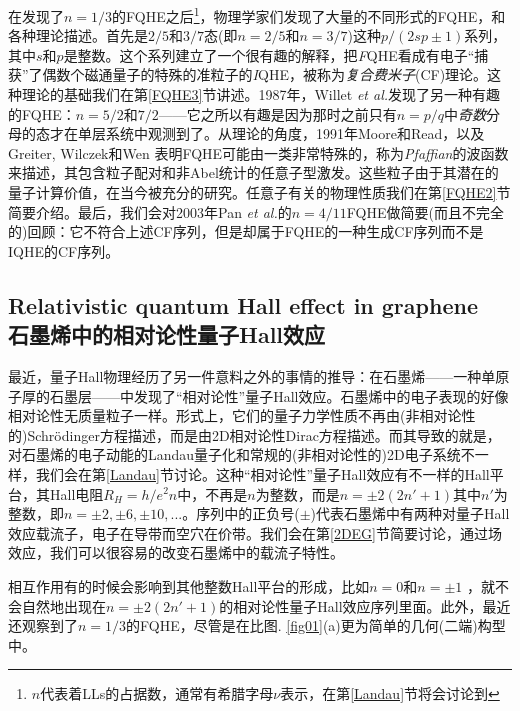 \documentclass[10pt]{book}
\newcommand\itt{\it\color{blue}}
\begin{document}
在发现了$n=1/3$的FQHE之后\footnote{$n$代表着LLs的占据数，通常有希腊字母$\nu$表示，在第\ref{Landau}节将会讨论到}，物理学家们发现了大量的不同形式的FQHE，和各种理论描述。首先是$2/5$和$3/7$态(即$n=2/5$和$n=3/7$)这种$p/(2sp\pm 1)$系列，其中$s$和$p$是整数。这个系列建立了一个很有趣的解释，把{\sl F}QHE看成有电子``捕获''了偶数个磁通量子的特殊的准粒子的{\sl I}QHE，被称为{\itt 复合费米子}(CF)理论\cite{Jain1,Jain2}。这种理论的基础我们在第\ref{FQHE3}节讲述。1987年，Willet {\sl et al.}发现了另一种有趣的FQHE：$n=5/2$和$7/2$\cite{willett}——它之所以有趣是因为那时之前只有$n=p/q$中{\itt 奇数}分母的态才在单层系统中观测到了。从理论的角度，1991年Moore和Read\cite{MR}，以及Greiter, Wilczek和Wen \cite{GWW}表明FQHE可能由一类非常特殊的，称为{\sl Pfaffian}的波函数来描述，其包含粒子配对和非Abel统计的任意子型激发。这些粒子由于其潜在的量子计算价值，在当今被充分的研究。任意子有关的物理性质我们在第\ref{FQHE2}节简要介绍。最后，我们会对2003年Pan {\sl et al.}\cite{Pan}的$n=4/11$FQHE做简要(而且不完全的)回顾：它不符合上述CF序列，但是却属于FQHE的一种生成CF序列而不是IQHE的CF序列。


\subsection[石墨烯中的相对论性量子Hall效应]{Relativistic quantum Hall effect in graphene\\\bf 石墨烯中的相对论性量子Hall效应}

最近，量子Hall物理经历了另一件意料之外的事情的推导：在石墨烯——一种单原子厚的石墨层——中发现了``相对论性''量子Hall效应\cite{graph1,graph2}。石墨烯中的电子表现的好像相对论性无质量粒子一样。形式上，它们的量子力学性质不再由(非相对论性的)Schr\"odinger方程描述，而是由2D相对论性Dirac方程\cite{antonioRev}描述。而其导致的就是，对石墨烯的电子动能的Landau量子化和常规的(非相对论性的)2D电子系统不一样，我们会在第\ref{Landau}节讨论。这种``相对论性''量子Hall效应有不一样的Hall平台，其Hall电阻$R_H=h/e^2 n$中，不再是$n$为整数，而是$n=\pm 2(2n'+1)$其中$n'$为整数，即$n=\pm2, \pm6, \pm 10, ...$。序列中的正负号($\pm$)代表石墨烯中有两种对量子Hall效应载流子，电子在导带而空穴在价带。我们会在第\ref{2DEG}节简要讨论，通过场效应，我们可以很容易的改变石墨烯中的载流子特性。

相互作用有的时候会影响到其他整数Hall平台的形成，比如$n=0$和$n=\pm 1$ \cite{zhang}，就不会自然地出现在$n=\pm 2(2n'+1)$的相对论性量子Hall效应序列里面。此外，最近还观察到了$n=1/3$的FQHE，尽管是在比图. \ref{fig01}(a)更为简单的几何(二端)构型中\cite{grapheneFQHE1,grapheneFQHE2}。
\end{document}
